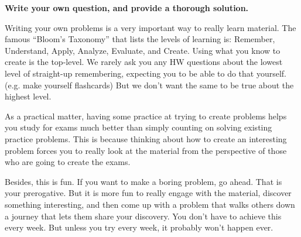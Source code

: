 
{\bf Write your own question, and provide a thorough solution.}

Writing your own problems is a very important way to really learn
material. The famous ``Bloom's Taxonomy'' that lists the levels of
learning is: Remember, Understand, Apply, Analyze, Evaluate, and
Create. Using what you know to create is the top-level. We rarely ask
you any HW questions about the lowest level of straight-up
remembering, expecting you to be able to do that yourself. (e.g. make
yourself flashcards) But we don't want the same to be true about the
highest level.

As a practical matter, having some practice at trying to create
problems helps you study for exams much better than simply counting on
solving existing practice problems. This is because thinking about how
to create an interesting problem forces you to really look at the
material from the perspective of those who are going to create the
exams. 

Besides, this is fun. If you want to make a boring problem, go
ahead. That is your prerogative. But it is more fun to really engage
with the material, discover something interesting, and then come up
with a problem that walks others down a journey that lets them share
your discovery. You don't have to achieve this every week. But unless
you try every week, it probably won't happen ever. 